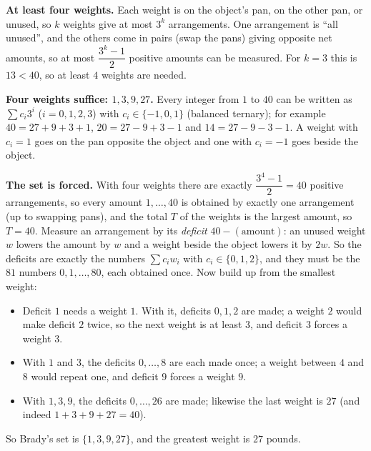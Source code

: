 \textbf{At least four weights.} Each weight is on the object's pan, on the other pan, or unused, so $k$ weights give at most $3^k$ arrangements. One arrangement is ``all unused'', and the others come in pairs (swap the pans) giving opposite net amounts, so at most $\dfrac{3^k-1}{2}$ positive amounts can be measured. For $k=3$ this is $13<40$, so at least $4$ weights are needed.

\textbf{Four weights suffice: $1,3,9,27$.} Every integer from $1$ to $40$ can be written as $\sum c_i3^i$ ($i=0,1,2,3$) with $c_i\in\{-1,0,1\}$ (balanced ternary); for example $40=27+9+3+1$, $20=27-9+3-1$ and $14=27-9-3-1$. A weight with $c_i=1$ goes on the pan opposite the object and one with $c_i=-1$ goes beside the object.

\textbf{The set is forced.} With four weights there are exactly $\dfrac{3^4-1}{2}=40$ positive arrangements, so every amount $1,\dots,40$ is obtained by exactly one arrangement (up to swapping pans), and the total $T$ of the weights is the largest amount, so $T=40$. Measure an arrangement by its \emph{deficit} $40-(\text{amount})$: an unused weight $w$ lowers the amount by $w$ and a weight beside the object lowers it by $2w$. So the deficits are exactly the numbers $\sum c_iw_i$ with $c_i\in\{0,1,2\}$, and they must be the $81$ numbers $0,1,\dots,80$, each obtained once. Now build up from the smallest weight:
\begin{itemize}
\item Deficit $1$ needs a weight $1$. With it, deficits $0,1,2$ are made; a weight $2$ would make deficit $2$ twice, so the next weight is at least $3$, and deficit $3$ forces a weight $3$.
\item With $1$ and $3$, the deficits $0,\dots,8$ are each made once; a weight between $4$ and $8$ would repeat one, and deficit $9$ forces a weight $9$.
\item With $1,3,9$, the deficits $0,\dots,26$ are made; likewise the last weight is $27$ (and indeed $1+3+9+27=40$).
\end{itemize}
So Brady's set is $\{1,3,9,27\}$, and the greatest weight is $\boxed{27}$ pounds.
